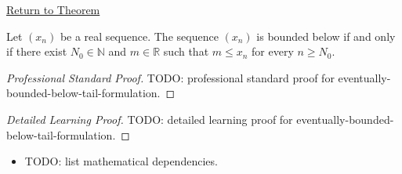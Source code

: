 \newpage
{}
\label{prf:eventually-bounded-below-tail-formulation}

\begin{remark*}[Return]
\hyperref[thm:eventually-bounded-below-tail-formulation]{Return to Theorem}
\end{remark*}

\begin{theorem*}
Let $(x_n)$ be a real sequence. The sequence $(x_n)$ is bounded below if and
only if there exist $N_0 \in \mathbb{N}$ and $m \in \mathbb{R}$ such that
$m \le x_n$ for every $n \ge N_0$.

\smallskip
\noindent
\end{theorem*}

\begin{proof}[Professional Standard Proof]
\LRAProofBodyStart
TODO: professional standard proof for eventually-bounded-below-tail-formulation.
\end{proof}

\begin{proof}[Detailed Learning Proof]
\LRAProofBodyStart
TODO: detailed learning proof for eventually-bounded-below-tail-formulation.
\end{proof}

\begin{remark*}
\end{remark*}

\begin{dependencies}
\begin{itemize}
  \item TODO: list mathematical dependencies.
\end{itemize}
\end{dependencies}

\clearpage
